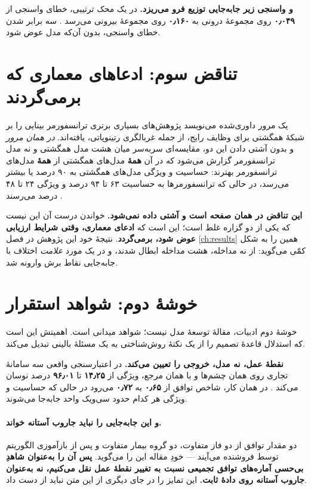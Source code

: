 \textbf{و واسنجی زیر جابه‌جایی توزیع فرو می‌ریزد.} در یک محک ترتیبی، خطای واسنجی از
\textbf{\num{۰٫۰۴۹}} روی مجموعهٔ درونی به \textbf{\num{۰٫۱۶۰}} روی مجموعهٔ بیرونی می‌رسد
\cite{sheng2026orderdr}. سه برابر شدن خطای واسنجی، بدون آن‌که مدل عوض شود.

\section{تناقض سوم: ادعاهای معماری که برمی‌گردند}
\label{sec:contradiction3}

یک مرور داوری‌شده می‌نویسد پژوهش‌های بسیاری برتری ترانسفورمر بینایی را بر شبکهٔ همگشتی برای
وظایف رایج، از جمله غربالگری رتینوپاتی، یافته‌اند. \emph{در همان مرور} و بدون آشتی دادن این
دو، مقایسه‌ای سربه‌سر میان هشت مدل همگشتی و نه مدل ترانسفورمر گزارش می‌شود که در آن
\textbf{همهٔ} مدل‌های همگشتی از \textbf{همهٔ} مدل‌های ترانسفورمر بهترند: حساسیت و ویژگی
مدل‌های همگشتی به \num{۹۰} درصد یا بیشتر می‌رسد، در حالی که ترانسفورمرها به حساسیت \num{۶۳} تا \num{۹۴} درصد و
ویژگی \num{۲۴} تا \num{۴۸} درصد می‌رسند \cite{ruamviboonsuk2024review}.

\textbf{این تناقض در همان صفحه است و آشتی داده نمی‌شود.} خواندن درست آن این نیست که یکی از دو
گزاره غلط است؛ این است که \textbf{ادعای معماری، وقتی شرایط ارزیابی عوض شود، برمی‌گردد}. نتیجهٔ
خود این پژوهش در فصل \ref{ch:results} همین را به شکل کمّی می‌گوید: از نه مداخله، هشت مداخله
ابطال شدند، و در یک مورد \emph{علامت} اختلاف با جابه‌جایی نقاط برش وارونه شد.

\section{خوشهٔ دوم: شواهد استقرار}
\label{sec:deployment}

خوشهٔ دوم ادبیات، مقالهٔ توسعهٔ مدل نیست؛ شواهد میدانی است. اهمیتش این است که استدلال قاعدهٔ
تصمیم را از یک نکتهٔ روش‌شناختی به یک مسئلهٔ بالینی تبدیل می‌کند.

\textbf{نقطهٔ عمل، نه مدل، خروجی را تعیین می‌کند.} در اعتبارسنجی واقعی سه سامانهٔ تجاری روی
همان چشم‌ها و با همان مرجع، ویژگی از \textbf{\num{۱۴٫۲۵}} تا \textbf{\num{۹۶٫۰۱}} درصد نوسان می‌کند
\cite{duggal2025realworld}. در همان کار، شاخص توافق از \textbf{\num{۰٫۶۵}} به \textbf{\num{۰٫۷۲}}
می‌رود در حالی که حساسیت و ویژگی هر کدام حدود سی‌ویک واحد جابه‌جا می‌شوند.

\paragraph{و این جابه‌جایی را نباید جاروب آستانه خواند.} دو مقدار توافق از دو فاز متفاوت، دو
گروه بیمار متفاوت و پس از بازآموزی الگوریتم توسط فروشنده می‌آیند — خودِ مقاله این را می‌گوید.
\textbf{پس آن را به‌عنوان شاهدِ بی‌حسی آماره‌های توافق تجمیعی نسبت به تغییر نقطهٔ عمل نقل
می‌کنیم، نه به‌عنوان جاروب آستانه روی دادهٔ ثابت.} این تمایز را در جای دیگری از این متن نباید
از دست داد.

